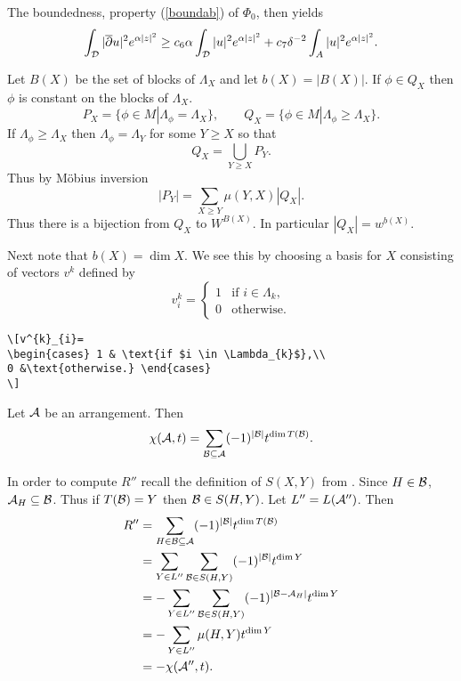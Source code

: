 The boundedness, property (\ref{boundab}) of $\Phi_ 0$, then yields
\[\int_{\cal D}|\overline\partial u|^2e^{\alpha|z|^2}\geq c_6\alpha
\int_{\cal D}|u|^2e^{\alpha|z|^2}+c_7\delta^{-2}\int_ A|u|^2e^{\alpha|z|^2}.\]

Let $B(X)$ be the set of blocks of $\Lambda_{X}$
and let $b(X) = |B(X)|$. If $\phi \in Q_{X}$ then
$\phi$ is constant on the blocks of $\Lambda_{X}$.
\begin{equation}\label{far-d}
 P_{X} = \{ \phi \in M | \Lambda_{\phi} = \Lambda_{X} \},
\qquad
Q_{X} = \{\phi \in M | \Lambda_{\phi} \geq \Lambda_{X} \}.
\end{equation}
If $\Lambda_{\phi} \geq \Lambda_{X}$ then
$\Lambda_{\phi} = \Lambda_{Y}$ for some $Y \geq X$ so that
\[ Q_{X} = \bigcup_{Y \geq X} P_{Y}. \]
Thus by M\"obius inversion
\[ |P_{Y}|= \sum_{X\geq Y} \mu (Y,X)|Q_{X}|.\]
Thus there is a bijection from $Q_{X}$ to $W^{B(X)}$.
In particular $|Q_{X}| = w^{b(X)}$.

Next note that $b(X)=\dim X$. We see this by choosing a
basis for $X$ consisting of vectors $v^{k}$ defined by
\[v^{k}_{i}=
\begin{cases} 1 & \text{if $i \in \Lambda_{k}$},\\
0 &\text{otherwise.} \end{cases}
\]
\begin{verbatim}
\[v^{k}_{i}=
\begin{cases} 1 & \text{if $i \in \Lambda_{k}$},\\
0 &\text{otherwise.} \end{cases}
\]
\end{verbatim}

\begin{lem}\label{p0201}
Let ${\cal A}$ be an arrangement. Then
\[ \chi ({\cal A},t) = \sum_{{\cal B} \subseteq {\cal A}}
(-1)^{|{\cal B}|} t^{\dim T({\cal B})}. \]
\end{lem}

In order to compute $R''$ recall the definition
of $S(X,Y)$ from . Since $H \in {\cal B}$,
${\cal A}_{H} \subseteq {\cal B}$. Thus if $T({\cal B}) = Y$ then
${\cal B} \in S(H,Y)$. Let $L'' = L({\cal A}'')$. Then
\begin{equation}\label{E_SXgYy}
\begin{split}
R''&= \sum_{H\in {\cal B} \subseteq {\cal A}} (-1)^{|{\cal B}|}
t^{\dim T({\cal B})}\\
&= \sum_{Y \in L''} \sum_{{\cal B} \in S(H,Y)}
(-1)^{|{\cal B}|}t^{\dim Y} \\
&= -\sum_{Y \in L''} \sum_{{\cal B} \in S(H,Y)} (-1)^
{|{\cal B} - {\cal A}_{H}|} t^{\dim Y} \\
&= -\sum_{Y \in L''} \mu (H,Y)t^{\dim Y} \\
&= -\chi ({\cal A} '',t).
\end{split}
\end{equation}

